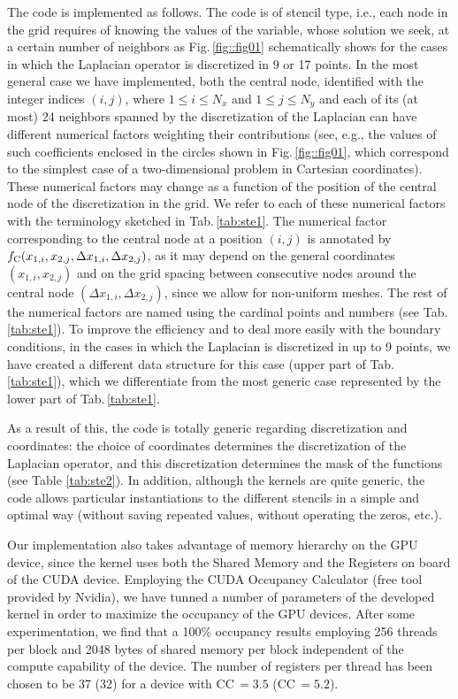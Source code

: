 \documentclass[preprint,12pt]{elsarticle}
\begin{document}
The code is implemented as follows. The code is of stencil type, i.e.,
each node in the grid requires of knowing the values of the variable,
whose solution we seek, at a certain number of neighbors as
Fig.\,\mbox{\ref{fig::fig01}} schematically shows for the cases in
which the Laplacian operator is discretized in 9 or 17 points. In the
most general case we have implemented, both the central node,
identified with the integer indices $(i,j)$, where $1\le i \le N_x$
and $1\le j \le N_y$ and each of its (at most) 24 neighbors spanned by
the discretization of the Laplacian can have different numerical
factors weighting their contributions (see, e.g., the values of such
coefficients enclosed in the circles shown in
Fig.\,\mbox{\ref{fig::fig01}}, which correspond to the simplest case
of a two-dimensional problem in Cartesian coordinates). These
numerical factors may change as a function of the position of the
central node of the discretization in the grid. We refer to each of
these numerical factors with the terminology sketched in
Tab.\,\mbox{\ref{tab:ste1}}. The numerical factor corresponding to the
central node at a position $(i,j)$ is annotated by
$f_{\rm C}(x_{1,i},x_{2,j},\Delta x_{1,i}, \Delta x_{2,j})$, as it may
depend on the general coordinates $(x_{1,i},x_{2,j})$ and on the grid
spacing between consecutive nodes around the central node
$(\Delta x_{1,i},\Delta x_{2,j})$, since we allow for non-uniform
meshes. The rest of the numerical factors are named using the cardinal
points and numbers (see Tab.\,\ref{tab:ste1}). To improve
  the efficiency and to deal more easily with the boundary
  conditions, in the cases in which the Laplacian is discretized in
up to 9 points, we have created a different data structure for this
case (upper part of Tab.\,\mbox{\ref{tab:ste1}}), which we
differentiate from the most generic case represented by the lower part
of Tab.\,\mbox{\ref{tab:ste1}}.

As a result of this, the code is totally generic regarding
discretization and coordinates: the choice of coordinates determines
the discretization of the Laplacian operator, and this discretization
determines the mask of the functions (see Table \ref{tab:ste2}). In
addition, although the kernels are quite generic, the code allows
particular instantiations to the different stencils in a simple and
optimal way (without saving repeated values, without operating the
zeros, etc.).

Our implementation also takes advantage of memory hierarchy
on the GPU device, since the kernel uses both the Shared
Memory and the Registers on board of the CUDA
  device. Employing
  the CUDA Occupancy Calculator (free tool provided by Nvidia), we
  have tunned a number of parameters of the developed kernel in order
  to maximize the occupancy of the GPU devices. After some
  experimentation, we find that a 100\% occupancy results employing 
  256 threads per block and 2048 bytes of shared memory per block
  independent of the compute capability of the device. The number of
  registers per thread has been chosen to be 37 (32) for a device with
  CC\,$=3.5$ (CC\,$=5.2$).
\end{document}
